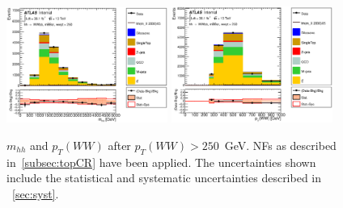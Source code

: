 \begin{figure}[!h]
\begin{center}
\includegraphics*[width=0.47\textwidth] {figures/ControlPlots/reOpt2000/C_mBBcr_reOpt2000_bbpt350_wwpt250_hhMass_regionA_met25d020}
\includegraphics*[width=0.47\textwidth] {figures/ControlPlots/reOpt2000/C_mBBcr_reOpt2000_bbpt350_wwpt250_WWPt_regionA_met25d020.eps}
\caption[$m_{hh}$ and  $p_{T}(WW)$ after $p_{T}(WW) > 250$~GeV.]{$m_{hh}$ and  $p_{T}(WW)$ after $p_{T}(WW) > 250$~GeV.  \ttbar NFs as described in~\ref{subsec:topCR} have been applied. The uncertainties shown include the statistical and systematic uncertainties described in ~\ref{sec:syst}.}
\end{center}
\end{figure}

